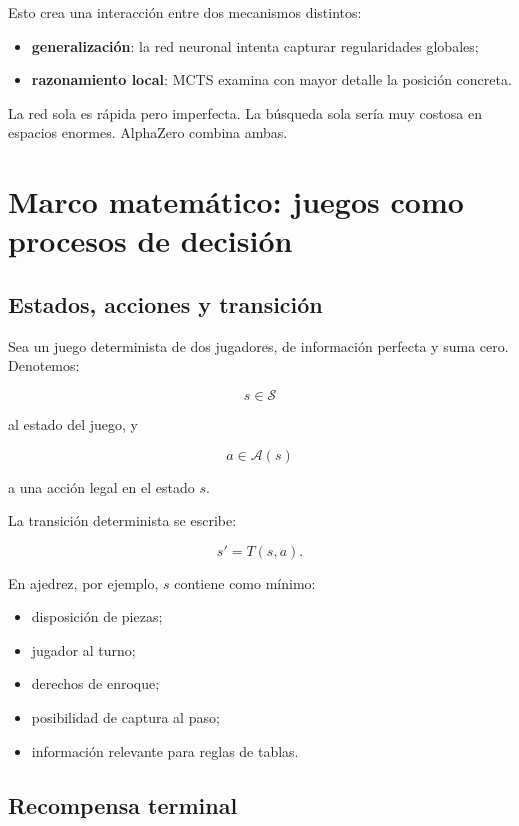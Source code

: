 \documentclass[11pt,a4paper]{article}
\begin{document}
Esto crea una interacción entre dos mecanismos distintos:

\begin{itemize}
    \item \textbf{generalización}: la red neuronal intenta capturar regularidades globales;
    \item \textbf{razonamiento local}: MCTS examina con mayor detalle la posición concreta.
\end{itemize}

La red sola es rápida pero imperfecta. La búsqueda sola sería muy costosa en espacios enormes. AlphaZero combina ambas.

\section{Marco matemático: juegos como procesos de decisión}

\subsection{Estados, acciones y transición}

Sea un juego determinista de dos jugadores, de información perfecta y suma cero. Denotemos:

\[
s \in \mathcal{S}
\]

al estado del juego, y

\[
a \in \mathcal{A}(s)
\]

a una acción legal en el estado \(s\).

La transición determinista se escribe:

\[
s' = T(s,a).
\]

En ajedrez, por ejemplo, \(s\) contiene como mínimo:

\begin{itemize}
    \item disposición de piezas;
    \item jugador al turno;
    \item derechos de enroque;
    \item posibilidad de captura al paso;
    \item información relevante para reglas de tablas.
\end{itemize}

\subsection{Recompensa terminal}
\end{document}
